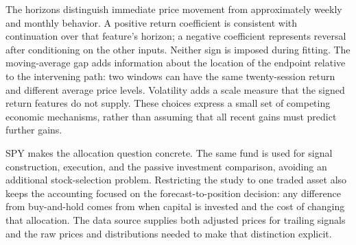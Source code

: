 The horizons distinguish immediate price movement from approximately weekly and monthly behavior. A positive return coefficient is consistent with continuation over that feature's horizon; a negative coefficient represents reversal after conditioning on the other inputs. Neither sign is imposed during fitting. The moving-average gap adds information about the location of the endpoint relative to the intervening path: two windows can have the same twenty-session return and different average price levels. Volatility adds a scale measure that the signed return features do not supply. These choices express a small set of competing economic mechanisms, rather than assuming that all recent gains must predict further gains.

SPY makes the allocation question concrete. The same fund is used for signal construction, execution, and the passive investment comparison, avoiding an additional stock-selection problem. Restricting the study to one traded asset also keeps the accounting focused on the forecast-to-position decision: any difference from buy-and-hold comes from when capital is invested and the cost of changing that allocation. The data source supplies both adjusted prices for trailing signals and the raw prices and distributions needed to make that distinction explicit.

